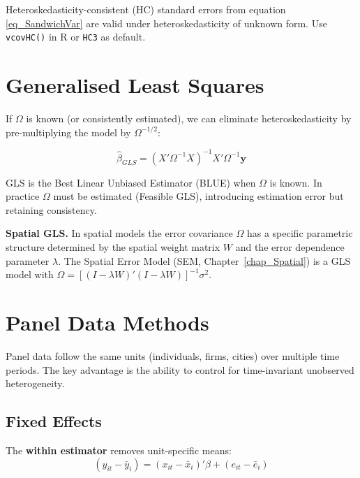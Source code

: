 \begin{tcolorbox}[keyresult]
Heteroskedasticity-consistent (HC) standard errors from equation
\eqref{eq_SandwichVar} are valid under heteroskedasticity of unknown form.
Use \texttt{vcovHC()} in R or \texttt{HC3} as default.
\end{tcolorbox}


\section{Generalised Least Squares}
\label{sec_GLS}

If $\Omega$ is known (or consistently estimated), we can eliminate
heteroskedasticity by pre-multiplying the model by $\Omega^{-1/2}$:

\begin{tcolorbox}[keyresult]
\begin{equation}
  \hat\beta_{GLS} = (X'\Omega^{-1}X)^{-1}X'\Omega^{-1}\mathbf{y}
\end{equation}
\end{tcolorbox}

GLS is the Best Linear Unbiased Estimator (BLUE) when $\Omega$ is known.
In practice $\Omega$ must be estimated (Feasible GLS), introducing estimation
error but retaining consistency.

\noindent\textbf{Spatial GLS.} In spatial models the error covariance
$\Omega$ has a specific parametric structure determined by the spatial weight
matrix $W$ and the error dependence parameter $\lambda$. The Spatial Error
Model (SEM, Chapter~\ref{chap_Spatial}) is a GLS model with
$\Omega = [(I-\lambda W)'(I-\lambda W)]^{-1}\sigma^2$.


\section{Panel Data Methods}
\label{sec_Panel}

Panel data follow the same units (individuals, firms, cities) over multiple
time periods. The key advantage is the ability to control for time-invariant
unobserved heterogeneity.

\subsection{Fixed Effects}

The \textbf{within estimator} removes
unit-specific means:
\begin{equation}
  (y_{it} - \bar{y}_i) = (x_{it} - \bar{x}_i)'\beta + (e_{it} - \bar{e}_i)
\end{equation}

